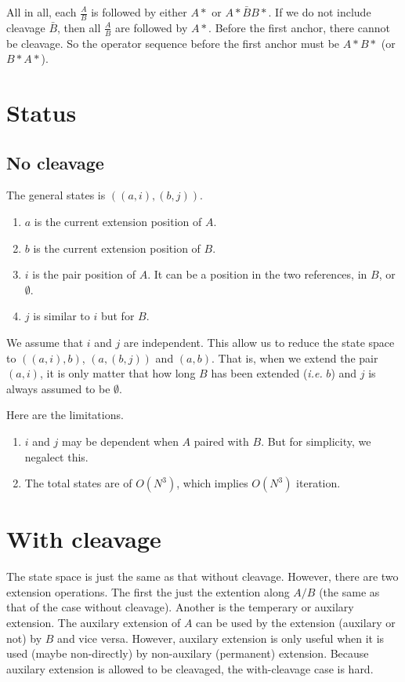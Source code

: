 \documentclass{article}
\begin{document}
All in all, each $\frac{A}{B}$ is followed by either $A*$ or $A*\bar{B}B*$. If we do not include cleavage $\bar{B}$, then all $\frac{A}{B}$ are followed by $A*$. Before the first anchor, there cannot be cleavage. So the operator sequence before the first anchor must be $A*B*$ (or $B*A*$).

\section{Status}

\subsection{No cleavage}

The general states is $((a, i), (b, j))$.
\begin{enumerate}
\item $a$ is the current extension position of $A$.
\item $b$ is the current extension position of $B$.
\item $i$ is the pair position of $A$. It can be a position in the two references, in $B$, or $\emptyset$.
\item $j$ is similar to $i$ but for $B$. 
\end{enumerate}

We assume that $i$ and $j$ are independent. This allow us to reduce the state space to $((a, i), b)$, $(a, (b, j))$ and $(a,b)$. That is, when we extend the pair $(a, i)$, it is only matter that how long $B$ has been extended ({\it i.e.} $b$) and $j$ is always assumed to be $\emptyset$.

Here are the limitations.
\begin{enumerate}
\item $i$ and $j$ may be dependent when $A$ paired with $B$. But for simplicity, we negalect this.
\item The total states are of $O(N^3)$, which implies $O(N^3)$ iteration. 
\end{enumerate}

\section{With cleavage}

The state space is just the same as that without cleavage. However, there are two extension operations. The first the just the extention along $A/B$ (the same as that of the case without cleavage). Another is the temperary or auxilary extension. The auxilary extension of $A$ can be used by the extension (auxilary or not) by $B$ and vice versa. However, auxilary extension is only useful when it is used (maybe non-directly) by non-auxilary (permanent) extension. Because auxilary extension is allowed to be cleavaged, the with-cleavage case is hard.
\end{document}
